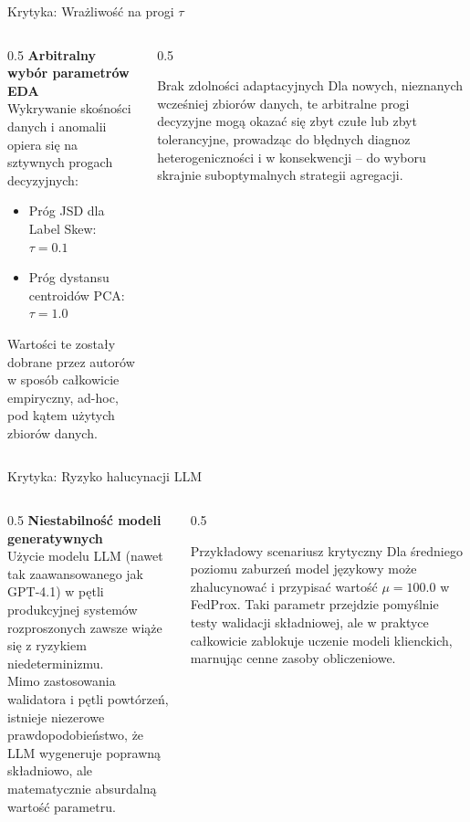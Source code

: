 \documentclass[9pt,aspectratio=169]{beamer}
\begin{document}
\begin{frame}{Krytyka: Wrażliwość na progi $\tau$}
\begin{columns}[T]
\begin{column}{0.5\textwidth}
\textbf{Arbitralny wybór parametrów EDA}\\[4pt]
Wykrywanie skośności danych i anomalii opiera się na sztywnych progach decyzyjnych:
\begin{itemize}\footnotesize
\item Próg JSD dla Label Skew: $\tau=0.1$
\item Próg dystansu centroidów PCA: $\tau=1.0$
\end{itemize}
Wartości te zostały dobrane przez autorów w sposób całkowicie empiryczny, ad-hoc, pod kątem użytych zbiorów danych.
\end{column}
\begin{column}{0.5\textwidth}
\begin{infoboxorange}{Brak zdolności adaptacyjnych}
Dla nowych, nieznanych wcześniej zbiorów danych, te arbitralne progi decyzyjne mogą okazać się zbyt czułe lub zbyt tolerancyjne, prowadząc do błędnych diagnoz heterogeniczności i w konsekwencji -- do wyboru skrajnie suboptymalnych strategii agregacji.
\end{infoboxorange}
\end{column}
\end{columns}
\end{frame}

\begin{frame}{Krytyka: Ryzyko halucynacji LLM}
\begin{columns}[T]
\begin{column}{0.5\textwidth}
\textbf{Niestabilność modeli generatywnych}\\[4pt]
Użycie modelu LLM (nawet tak zaawansowanego jak GPT-4.1) w pętli produkcyjnej systemów rozproszonych zawsze wiąże się z ryzykiem niedeterminizmu.\\[6pt]
Mimo zastosowania walidatora i pętli powtórzeń, istnieje niezerowe prawdopodobieństwo, że LLM wygeneruje poprawną składniowo, ale matematycznie absurdalną wartość parametru.
\end{column}
\begin{column}{0.5\textwidth}
\begin{infoboxorange}{Przykładowy scenariusz krytyczny}
Dla średniego poziomu zaburzeń model językowy może zhalucynować i przypisać wartość $\mu=100.0$ w FedProx. Taki parametr przejdzie pomyślnie testy walidacji składniowej, ale w praktyce całkowicie zablokuje uczenie modeli klienckich, marnując cenne zasoby obliczeniowe.
\end{infoboxorange}
\end{column}
\end{columns}
\end{frame}
\end{document}
